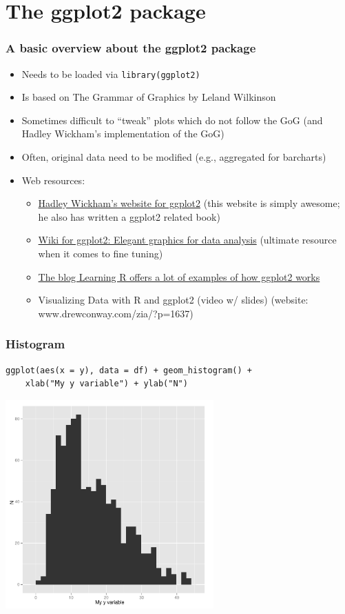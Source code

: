 \documentclass[bigger]{beamer}
\begin{document}
\section{The ggplot2 package}
\label{sec-3}
\begin{frame}[shrink = 10]
\frametitle{A basic overview about the ggplot2 package}
\label{sec-3_1}


\begin{itemize}
\item Needs to be loaded via \texttt{library(ggplot2)}
\item Is based on The Grammar of Graphics by Leland Wilkinson
\item Sometimes difficult to ``tweak'' plots which do not follow the GoG (and Hadley Wickham's
  implementation of the GoG)
\item Often, original data need to be modified (e.g., aggregated for barcharts)
\item Web resources:

\begin{itemize}
\item \href{http://had.co.nz/ggplot2/}{Hadley Wickham's website for ggplot2} (this website is simply awesome; he also has
    written a ggplot2 related book)
\item \href{https://github.com/hadley/ggplot2/wiki}{Wiki for ggplot2: Elegant graphics for data analysis} (ultimate resource when it comes to fine tuning)
\item \href{http://learnr.wordpress.com/}{The blog Learning R offers a lot of examples of how ggplot2 works}
\item Visualizing Data with R and ggplot2 (video w/ slides) (website: www.drewconway.com/zia/?p=1637)
\end{itemize}

\end{itemize}
\end{frame}
\begin{frame}[fragile]
\frametitle{Histogram}
\label{sec-3_2}


\lstset{language=R}
\begin{lstlisting}
ggplot(aes(x = y), data = df) + geom_histogram() + 
    xlab("My y variable") + ylab("N")
\end{lstlisting}



\includegraphics[width=0.6\textwidth]{../graphs/ggplot2_hist.pdf}
\end{frame}
\end{document}
